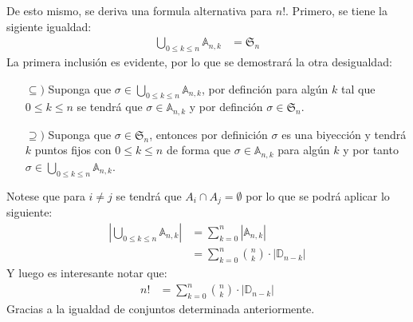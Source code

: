 \documentclass[12pt,a4paper,oneside]{memoir}
\begin{document}
De esto mismo, se deriva una formula alternativa para $n!$. Primero, se tiene la sigiente igualdad:
\begin{align*}
    \bigcup_{0 \le k \le n} \mathbb{A}_{n, k} &= \mathfrak{S}_n
\end{align*}
La primera inclusión es evidente, por lo que se demostrará la otra desigualdad:
\begin{itemize}
    \item[$\subseteq)$] Suponga que $\sigma \in \bigcup_{0 \le k \le n} \mathbb{A}_{n, k}$, por definción para algún $k$ tal que $0 \le k \le n$ se tendrá que $\sigma \in \mathbb{A}_{n, k}$ y por definción $\sigma \in \mathfrak{S}_n$.

    \item[$\supseteq)$] Suponga que $\sigma \in \mathfrak{S}_n$, entonces por definición $\sigma$ es una biyección y tendrá $k$ puntos fijos con $0 \le k \le n$ de forma que $\sigma \in \mathbb{A}_{n, k}$ para algún $k$ y por tanto $\sigma \in \bigcup_{0 \le k \le n} \mathbb{A}_{n, k}$.
\end{itemize}
Notese que para $i \neq j$ se tendrá que $A_i \cap A_j = \emptyset$ por lo que se podrá aplicar lo siguiente:
\begin{align*}
    |\bigcup_{0 \le k \le n} \mathbb{A}_{n, k}| &= \sum_{k = 0}^n |\mathbb{A}_{n, k}|\\
    &= \sum_{k = 0}^n \binom{n}{k} \cdot |\mathbb{D}_{n-k}|
\end{align*}
Y luego es interesante notar que:
\begin{align*}
    n! &= \sum_{k = 0}^n \binom{n}{k} \cdot |\mathbb{D}_{n-k}|
\end{align*}
Gracias a la igualdad de conjuntos determinada anteriormente.
\end{document}
